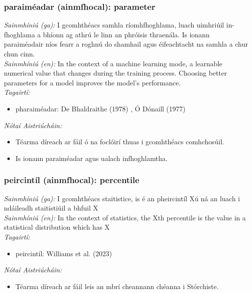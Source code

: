 \subsubsection*{paraiméadar (ainmfhocal): parameter}
 \noindent \textit{Sainmhíniú (ga):} I gcomhthéacs samhla ríomhfhoghlama, luach uimhriúil in-fhoghlama a bhíonn ag athrú le linn an phróisis thraenála. Is ionann paraiméadair níos fearr a roghnú do shamhail agus éifeachtacht na samhla a chur chun cinn.
\\
 \noindent \textit{Sainmhíniú (en):} In the context of a machine learning mode, a learnable numerical value that changes during the training process. Choosing better parameters for a model improves the model's performance.
\\
 \noindent \textit{Tagairtí:}
\begin{itemize}
	\item pharaiméadar: De Bhaldraithe (1978) \cite{de-bhaldraithe}, Ó Dónaill (1977) \cite{odonaill}
\end{itemize}

 \noindent \textit{Nótaí Aistriúcháin:}
\begin{itemize}
	\item Téarma díreach ar fáil ó na foclóirí thuas i gcomhthéacs comhchosúil.
	\item Is ionann paraiméadar agus ualach infhoghlamtha.
\end{itemize}


\subsubsection*{peircintíl (ainmfhocal): percentile}
 \noindent \textit{Sainmhíniú (ga):} I gcomhthéacs staitistice, is é an pheircintíl Xú ná an luach i ndáileadh staitistiúil a bhfuil X%
\\
 \noindent \textit{Sainmhíniú (en):} In the context of statistics, the Xth percentile is the value in a statistical distribution which has X%
\\
 \noindent \textit{Tagairtí:}
\begin{itemize}
	\item peircintíl: Williams et al. (2023) \cite{storchiste}
\end{itemize}

 \noindent \textit{Nótaí Aistriúcháin:}
\begin{itemize}
	\item Téarma díreach ar fáil leis an mbrí cheannann chéanna i Stórchiste.
\end{itemize}


